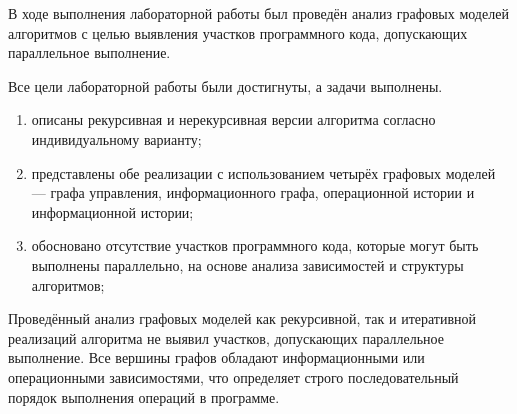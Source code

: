 

В ходе выполнения лабораторной работы был проведён анализ графовых моделей алгоритмов с целью выявления участков программного кода, допускающих параллельное выполнение.

Все цели лабораторной работы были достигнуты, а задачи выполнены.
\begin{enumerate}
	\item описаны рекурсивная и нерекурсивная версии алгоритма согласно индивидуальному варианту;
	\item представлены обе реализации с использованием четырёх графовых моделей --- графа управления, информационного графа, операционной истории и информационной истории;
	\item обосновано отсутствие участков программного кода, которые могут быть выполнены параллельно, на основе анализа зависимостей и структуры алгоритмов;
\end{enumerate}

Проведённый анализ графовых моделей как рекурсивной, так и итеративной реализаций алгоритма не выявил участков, допускающих параллельное выполнение. Все вершины графов обладают информационными или операционными зависимостями, что определяет строго последовательный порядок выполнения операций в программе.

